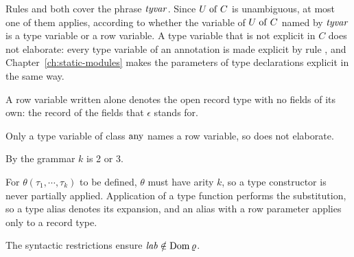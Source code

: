 




\begin{rulecomments}
 Rules  and 
both cover the phrase $\mathit{tyvar}$. Since $U \mathrel{\mathrm{of}} C$ is unambiguous, at most one of
them applies, according to whether the variable of $U \mathrel{\mathrm{of}} C$ named by $\mathit{tyvar}$
is a type variable or a row variable. A type variable that is not explicit in
$C$ does not elaborate: every type variable of an annotation is made explicit by
rule , and Chapter~\ref{ch:static-modules} makes the
parameters of type declarations explicit in the same way.

 A row variable written alone denotes the open record
type with no fields of its own: the record of the fields that $\epsilon$ stands
for.

 Only a type variable of class $\mathrm{any}$ names a row
variable, so  does not elaborate. %

 By the grammar $k$ is 2 or 3.

 For $\theta(\tau_1, \cdots, \tau_k)$ to be defined,
$\theta$ must have arity $k$, so a type constructor is never partially applied.
Application of a type function performs the substitution, so a type alias
denotes its expansion, and an alias with a row parameter applies only to a
record type.
\end{rulecomments}



\begin{rulecomments}
 The syntactic restrictions ensure $\mathit{lab} \notin
\mathrm{Dom}\,\varrho$.
\end{rulecomments}

